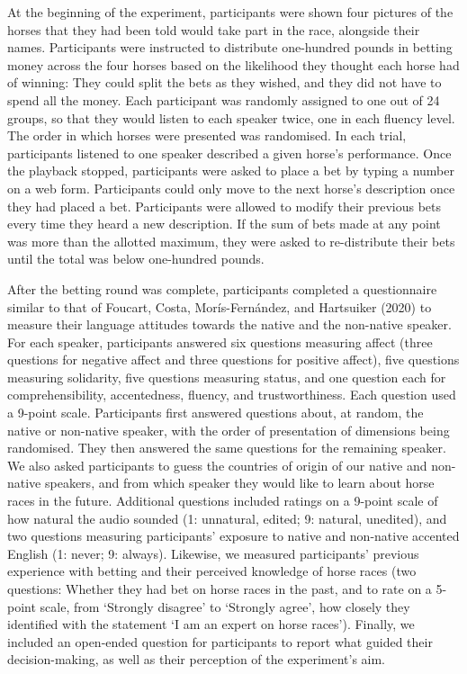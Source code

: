 \documentclass[
  man,floatsintext]{apa6}
\begin{document}
At the beginning of the experiment, participants were shown four pictures of the horses that they had been told would take part in the race, alongside their names. Participants were instructed to distribute one-hundred pounds in betting money across the four horses based on the likelihood they thought each horse had of winning: They could split the bets as they wished, and they did not have to spend all the money. Each participant was randomly assigned to one out of 24 groups, so that they would listen to each speaker twice, one in each fluency level. The order in which horses were presented was randomised. In each trial, participants listened to one speaker described a given horse's performance. Once the playback stopped, participants were asked to place a bet by typing a number on a web form. Participants could only move to the next horse's description once they had placed a bet. Participants were allowed to modify their previous bets every time they heard a new description. If the sum of bets made at any point was more than the allotted maximum, they were asked to re-distribute their bets until the total was below one-hundred pounds.

After the betting round was complete, participants completed a questionnaire similar to that of Foucart, Costa, Morís-Fernández, and Hartsuiker (2020) to measure their language attitudes towards the native and the non-native speaker. For each speaker, participants answered six questions measuring affect (three questions for negative affect and three questions for positive affect), five questions measuring solidarity, five questions measuring status, and one question each for comprehensibility, accentedness, fluency, and trustworthiness. Each question used a 9-point scale. Participants first answered questions about, at random, the native or non-native speaker, with the order of presentation of dimensions being randomised. They then answered the same questions for the remaining speaker. We also asked participants to guess the countries of origin of our native and non-native speakers, and from which speaker they would like to learn about horse races in the future. Additional questions included ratings on a 9-point scale of how natural the audio sounded (1: unnatural, edited; 9: natural, unedited), and two questions measuring participants' exposure to native and non-native accented English (1: never; 9: always). Likewise, we measured participants' previous experience with betting and their perceived knowledge of horse races (two questions: Whether they had bet on horse races in the past, and to rate on a 5-point scale, from `Strongly disagree' to `Strongly agree', how closely they identified with the statement `I am an expert on horse races'). Finally, we included an open-ended question for participants to report what guided their decision-making, as well as their perception of the experiment's aim.
\end{document}
